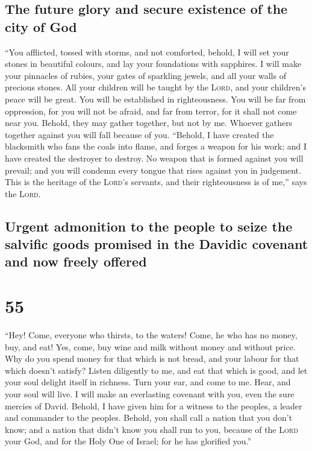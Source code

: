 \hypertarget{the-future-glory-and-secure-existence-of-the-city-of-god}{%
\subsection{The future glory and secure existence of the city of
God}\label{the-future-glory-and-secure-existence-of-the-city-of-god}}

 ``You afflicted, tossed with storms, and not comforted,
behold, I will set your stones in beautiful colours, and lay your
foundations with sapphires.  I will make your pinnacles
of rubies, your gates of sparkling jewels, and all your walls of
precious stones.  All your children will be taught by the
\textsc{Lord}, and your children's peace will be great. 
You will be established in righteousness. You will be far from
oppression, for you will not be afraid, and far from terror, for it
shall not come near you.  Behold, they may gather
together, but not by me. Whoever gathers together against you will fall
because of you.  ``Behold, I have created the blacksmith
who fans the coals into flame, and forges a weapon for his work; and I
have created the destroyer to destroy.  No weapon that is
formed against you will prevail; and you will condemn every tongue that
rises against you in judgement. This is the heritage of the
\textsc{Lord}'s servants, and their righteousness is of me,'' says the
\textsc{Lord}.

\hypertarget{urgent-admonition-to-the-people-to-seize-the-salvific-goods-promised-in-the-davidic-covenant-and-now-freely-offered}{%
\subsection{Urgent admonition to the people to seize the salvific goods
promised in the Davidic covenant and now freely
offered}\label{urgent-admonition-to-the-people-to-seize-the-salvific-goods-promised-in-the-davidic-covenant-and-now-freely-offered}}

\hypertarget{section-54}{%
\section{55}\label{section-54}}

 ``Hey! Come, everyone who thirsts, to the waters! Come,
he who has no money, buy, and eat! Yes, come, buy wine and milk without
money and without price.  Why do you spend money for that
which is not bread, and your labour for that which doesn't satisfy?
Listen diligently to me, and eat that which is good, and let your soul
delight itself in richness.  Turn your ear, and come to
me. Hear, and your soul will live. I will make an everlasting covenant
with you, even the sure mercies of David.  Behold, I have
given him for a witness to the peoples, a leader and commander to the
peoples.  Behold, you shall call a nation that you don't
know; and a nation that didn't know you shall run to you, because of the
\textsc{Lord} your God, and for the Holy One of Israel; for he has
glorified you.''

